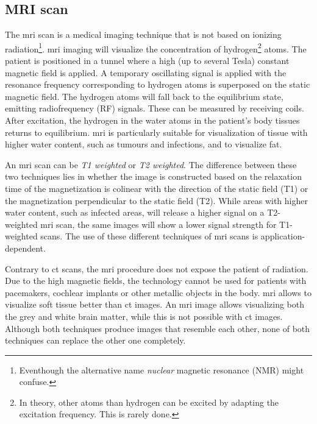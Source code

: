 \subsection{MRI scan}
\par{
    The \acrfull{mri} scan is a medical imaging technique that is not based on ionizing radiation\footnote{Eventhough the alternative name \textit{nuclear} magnetic resonance (NMR) might confuse.}.
    \acrshort{mri} imaging will visualize the concentration of hydrogen\footnote{In theory, other atoms than hydrogen can be excited by adapting the excitation frequency. This is rarely done.} atoms.
    The patient is positioned in a tunnel where a high (up to several Tesla) constant magnetic field is applied. A temporary oscillating signal is applied with the resonance frequency corresponding to hydrogen atoms is superposed on the static magnetic field.
    The hydrogen atoms will fall back to the equilibrium state, emitting radiofrequency (RF) signals. These can be measured by receiving coils.
    After excitation, the hydrogen in the water atoms in the patient's body tissues returns to equilibrium. \acrlong{mri} is particularly suitable for visualization of tissue with higher water content, such as tumours and infections, and to visualize fat.
}
\par{
    An \acrshort{mri} scan can be \textit{T1 weighted} or \textit{T2 weighted}. 
    The difference between these two techniques lies in whether the image is constructed based on the relaxation time of the magnetization is colinear with the direction of the static field (T1) or the magnetization perpendicular to the static field (T2).
    While areas with higher water content, such as infected areas, will release a higher signal on a T2-weighted \acrshort{mri} scan, the same images will show a lower signal strength for T1-weighted scans.
    The use of these different techniques of \acrshort{mri} scans is application-dependent.  
}
\par{
    Contrary to \acrfull{ct} scans, the \acrlong{mri} procedure does not expose the patient of radiation. Due to the high magnetic fields, the technology cannot be used for patients with pacemakers, cochlear implants or other metallic objects in the body.
    \acrshort{mri} allows to visualize soft tissue better than \acrshort{ct} images. An \acrshort{mri} image allows visualizing both the grey and white brain matter, while this is not possible with \acrshort{ct} images.
    Although both techniques produce images that resemble each other, none of both techniques can replace the other one completely.
}

